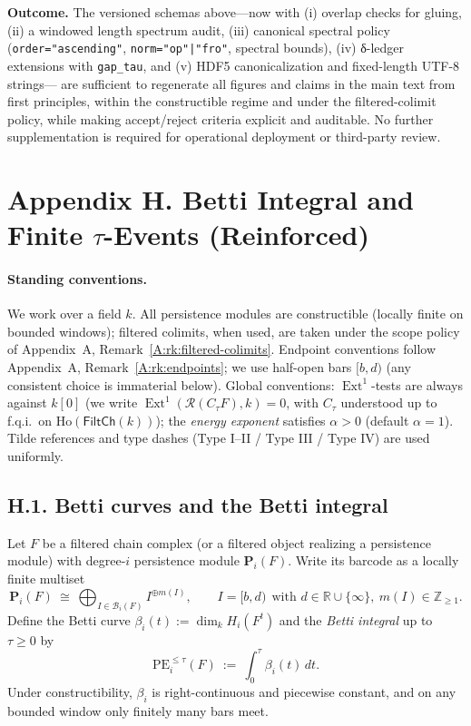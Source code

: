 \documentclass[11pt]{article}
\numberwithin{equation}{section}
\theoremstyle{plain}
\theoremstyle{definition}
\theoremstyle{remark}
\DeclareMathOperator{\Ext}{Ext}
\newcommand{\Ho}{\mathrm{Ho}}
\theoremstyle{plain}
\theoremstyle{definition}
\numberwithin{equation}{section}
\theoremstyle{definition}
\numberwithin{equation}{section}
\theoremstyle{plain}
\theoremstyle{definition}
\theoremstyle{remark}
\begin{document}
\medskip
\noindent\textbf{Outcome.}
The versioned schemas above—now with (i) overlap checks for gluing, (ii) a windowed length spectrum audit,
(iii) canonical spectral policy (\texttt{order="ascending"}, \texttt{norm="op"|"fro"}, spectral bounds),
(iv) δ-ledger extensions with \texttt{gap\_tau}, and (v) HDF5 canonicalization and fixed-length UTF-8 strings—
are sufficient to regenerate all figures and claims in the main text from first principles,
within the constructible regime and under the filtered-colimit policy, while making accept/reject criteria explicit and auditable.
No further supplementation is required for operational deployment or third-party review.



\section*{Appendix H. Betti Integral and Finite \texorpdfstring{$\tau$}{tau}-Events (Reinforced)}
{}
\label{H:betti-integral}

\paragraph{Standing conventions.}
We work over a field $k$. All persistence modules are constructible (locally finite on bounded windows); filtered colimits, when used, are taken under the scope policy of Appendix~A, Remark~\ref{A:rk:filtered-colimits}.
Endpoint conventions follow Appendix~A, Remark~\ref{A:rk:endpoints}; we use half-open bars $[b,d)$ (any consistent choice is immaterial below).
Global conventions: $\Ext^1$-tests are always against $k[0]$ (we write $\Ext^1(\mathcal{R}(C_\tau F),k)=0$, with $C_\tau$ understood up to f.q.i.\ on $\Ho(\mathsf{FiltCh}(k))$); the \emph{energy exponent} satisfies $\alpha>0$ (default $\alpha=1$).
Tilde references and type dashes (Type I--II / Type III / Type IV) are used uniformly.

\subsection*{H.1. Betti curves and the Betti integral}
Let $F$ be a filtered chain complex (or a filtered object realizing a persistence module) with degree-$i$ persistence module $\mathbf{P}_i(F)$.
Write its barcode as a locally finite multiset
\[
\mathbf{P}_i(F)\ \cong\ \bigoplus_{I\in \mathcal{B}_i(F)} I^{\oplus m(I)},\qquad I=[b,d)\ \ \text{with } d\in\mathbb{R}\cup\{\infty\},\ m(I)\in\mathbb{Z}_{\ge 1}.
\]
Define the Betti curve $\beta_i(t):=\dim_k H_i(F^t)$ and the \emph{Betti integral} up to $\tau\ge 0$ by
\[
\mathrm{PE}_i^{\le \tau}(F)\ :=\ \int_{0}^{\tau} \beta_i(t)\,dt.
\]
Under constructibility, $\beta_i$ is right-continuous and piecewise constant, and on any bounded window only finitely many bars meet.
\end{document}
